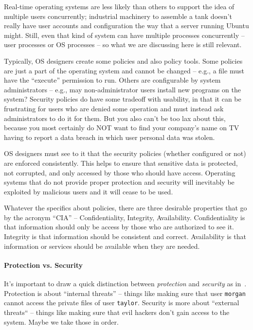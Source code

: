 Real-time operating systems are less likely than others to support the idea of multiple users concurrently; industrial machinery to assemble a tank doesn't really have user accounts and configuration the way that a server running Ubuntu might. Still, even that kind of system can have multiple processes concurrently -- user processes or OS processes -- so what we are discussing here is still relevant. 

Typically, OS designers create some policies and also policy tools. Some policies are just a part of the operating system and cannot be changed -- e.g., a file must have the ``execute'' permission to run. Others are configurable by system administrators -- e.g., may non-administrator users install new programs on the system? Security policies do have some tradeoff with usability, in that it can be frustrating for users who are denied some operation and must instead ask administrators to do it for them. But you also can't be too lax about this, because you most certainly do NOT want to find your company's name on TV having to report a data breach in which user personal data was stolen.

OS designers must see to it that the security policies (whether configured or not) are enforced consistently. This helps to ensure that sensitive data is protected, not corrupted, and only accessed by those who should have access. Operating systems that do not provide proper protection and security will inevitably be exploited by malicious users and it will cease to be used. 

Whatever the specifics about policies, there are three desirable properties that go by the acronym ``CIA'' -- Confidentiality, Integrity, Availability. Confidentiality is that information should only be access by those who are authorized to see it. Integrity is that information should be consistent and correct. Availability is that information or services should be available when they are needed.

\paragraph{Protection vs. Security} It's important to draw a quick distinction between \textit{protection} and \textit{security} as in~\cite{osc}. Protection is about ``internal threats'' -- things like making sure that user \texttt{morgan} cannot access the private files of user \texttt{taylor}. Security is more about ``external threats`` -- things like making sure that evil hackers don't gain access to the system. Maybe we take those in order.

